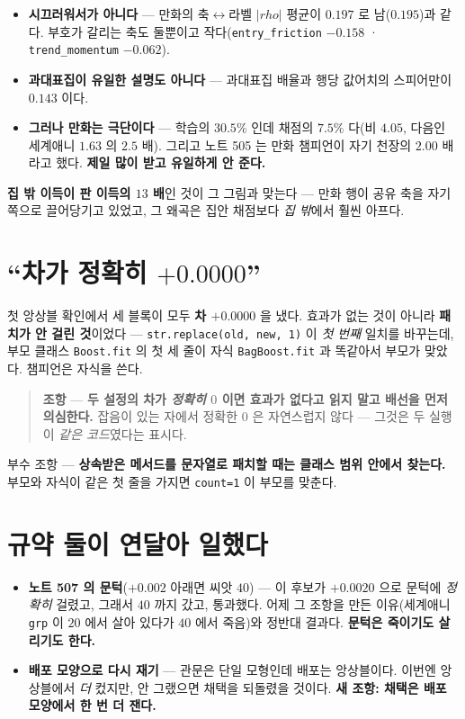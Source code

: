 \documentclass[11pt]{article}
\begin{document}
\begin{itemize}
\item \textbf{시끄러워서가 아니다} --- 만화의 축$\leftrightarrow$라벨
$|rho|$ 평균이 $0.197$ 로 남($0.195$)과 같다. 부호가 갈리는 축도 둘뿐이고
작다(\texttt{entry\_friction} $-0.158$ · \texttt{trend\_momentum}
$-0.062$).
\item \textbf{과대표집이 유일한 설명도 아니다} --- 과대표집 배율과 행당
값어치의 스피어만이 $0.143$ 이다.
\item \textbf{그러나 만화는 극단이다} --- 학습의 $\mathbf{30.5\%}$ 인데
채점의 $\mathbf{7.5\%}$ 다(비 $4.05$, 다음인 세계애니 $1.63$ 의 $2.5$ 배).
그리고 노트 505 는 만화 챔피언이 자기 천장의 $\mathbf{2.00}$ 배라고 했다.
\textbf{제일 많이 받고 유일하게 안 준다.}
\end{itemize}

\textbf{집 밖 이득이 판 이득의 $13$ 배}인 것이 그 그림과 맞는다 --- 만화
행이 공유 축을 자기 쪽으로 끌어당기고 있었고, 그 왜곡은 집안 채점보다
\emph{집 밖}에서 훨씬 아프다.

\section{``차가 정확히 $+0.0000$''}

첫 앙상블 확인에서 세 블록이 모두 \textbf{차 $+0.0000$} 을 냈다. 효과가
없는 것이 아니라 \textbf{패치가 안 걸린 것}이었다 ---
\texttt{str.replace(old, new, 1)} 이 \emph{첫 번째} 일치를 바꾸는데, 부모
클래스 \texttt{Boost.fit} 의 첫 세 줄이 자식 \texttt{BagBoost.fit} 과
똑같아서 부모가 맞았다. 챔피언은 자식을 쓴다.

\begin{quote}
\textbf{조항} --- \textbf{두 설정의 차가 \emph{정확히} $0$ 이면 효과가
없다고 읽지 말고 배선을 먼저 의심한다.} 잡음이 있는 자에서 정확한 $0$ 은
자연스럽지 않다 --- 그것은 두 실행이 \emph{같은 코드}였다는 표시다.
\end{quote}

부수 조항 --- \textbf{상속받은 메서드를 문자열로 패치할 때는 클래스 범위
안에서 찾는다.} 부모와 자식이 같은 첫 줄을 가지면 \texttt{count=1} 이
부모를 맞춘다.

\section{규약 둘이 연달아 일했다}

\begin{itemize}
\item \textbf{노트 507 의 문턱}($+0.002$ 아래면 씨앗 $40$) --- 이 후보가
$+0.0020$ 으로 문턱에 \emph{정확히} 걸렸고, 그래서 $40$ 까지 갔고,
통과했다. 어제 그 조항을 만든 이유(세계애니 \texttt{grp} 이 $20$ 에서
살아 있다가 $40$ 에서 죽음)와 정반대 결과다. \textbf{문턱은 죽이기도
살리기도 한다.}
\item \textbf{배포 모양으로 다시 재기} --- 관문은 단일 모형인데 배포는
앙상블이다. 이번엔 앙상블에서 \emph{더} 컸지만, 안 그랬으면 채택을
되돌렸을 것이다. \textbf{새 조항: 채택은 배포 모양에서 한 번 더 잰다.}
\end{itemize}
\end{document}
